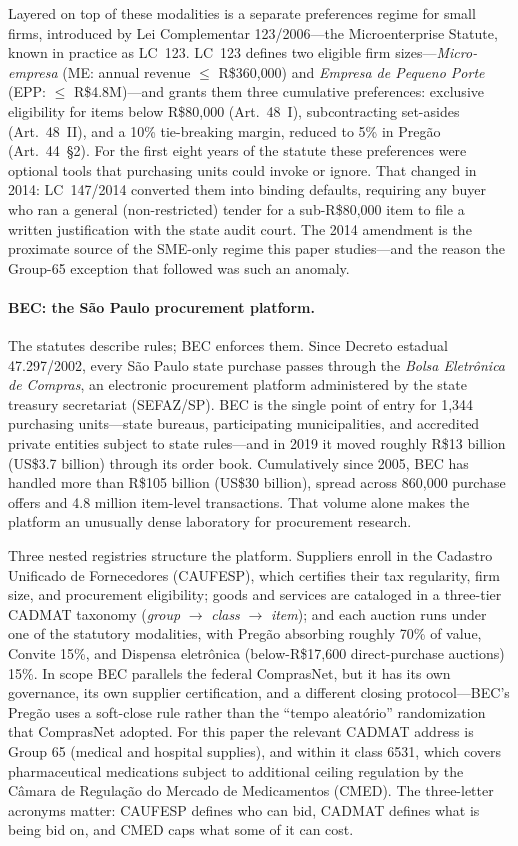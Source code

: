 \documentclass[12pt]{article}
\begin{document}
Layered on top of these modalities is a separate preferences regime
for small firms, introduced by Lei Complementar 123/2006---the
Microenterprise Statute, known in practice as LC~123. LC~123
defines two eligible firm sizes---\emph{Micro-empresa} (ME: annual
revenue $\leq$ R\$360{,}000) and \emph{Empresa de Pequeno Porte}
(EPP: $\leq$ R\$4.8M)---and grants them three cumulative
preferences: exclusive eligibility for items below R\$80{,}000
(Art.~48~I), subcontracting set-asides (Art.~48~II), and a 10\%
tie-breaking margin, reduced to 5\% in Preg\~ao (Art.~44~\S2).
For the first eight years of the statute these preferences were
optional tools that purchasing units could invoke or ignore.
That changed in 2014: LC~147/2014 converted them into binding
defaults, requiring any buyer who ran a general (non-restricted)
tender for a sub-R\$80{,}000 item to file a written justification
with the state audit court. The 2014 amendment is the proximate
source of the SME-only regime this paper studies---and the reason
the Group-65 exception that followed was such an anomaly.

\paragraph{BEC: the S\~ao Paulo procurement platform.}
The statutes describe rules; BEC enforces them. Since Decreto
estadual 47.297/2002, every São Paulo state purchase passes
through the \emph{Bolsa Eletr\^onica de Compras}, an electronic
procurement platform administered by the state treasury secretariat
(SEFAZ/SP). BEC is the single point of entry for 1{,}344 purchasing
units---state bureaus, participating municipalities, and accredited
private entities subject to state rules---and in 2019 it moved
roughly R\$13 billion (US\$3.7 billion) through its order book.
Cumulatively since 2005, BEC has handled more than R\$105 billion
(US\$30 billion), spread across 860{,}000 purchase offers and
4.8 million item-level transactions. That volume alone makes the
platform an unusually dense laboratory for procurement research.

Three nested registries structure the platform. Suppliers enroll
in the Cadastro Unificado de Fornecedores (CAUFESP), which
certifies their tax regularity, firm size, and procurement
eligibility; goods and services are cataloged in a three-tier
CADMAT taxonomy (\emph{group} $\to$ \emph{class} $\to$ \emph{item});
and each auction runs under one of the statutory modalities, with
Preg\~ao absorbing roughly 70\% of value, Convite 15\%, and
Dispensa eletr\^onica (below-R\$17{,}600 direct-purchase auctions)
15\%. In scope BEC parallels the federal ComprasNet, but it has
its own governance, its own supplier certification, and a different
closing protocol---BEC's Preg\~ao uses a soft-close rule rather
than the ``tempo aleat\'orio'' randomization that ComprasNet
adopted. For this paper the relevant CADMAT address is Group 65
(medical and hospital supplies), and within it class 6531, which
covers pharmaceutical medications subject to additional ceiling
regulation by the C\^amara de Regula\c{c}\~ao do Mercado de
Medicamentos (CMED). The three-letter acronyms matter: CAUFESP
defines who can bid, CADMAT defines what is being bid on, and
CMED caps what some of it can cost.
\end{document}

